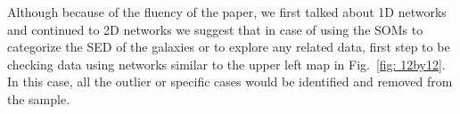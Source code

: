     Although because of the fluency of the paper, we first talked about 1D networks and continued to 2D networks we suggest that in case of using the SOMs to categorize the SED of the galaxies or to explore any related data, first step to be checking data using networks similar to the upper left map in Fig.~\ref{fig: 12by12}.
    In this case, all the outlier or specific cases would be identified and removed from the sample. 

    
    
    